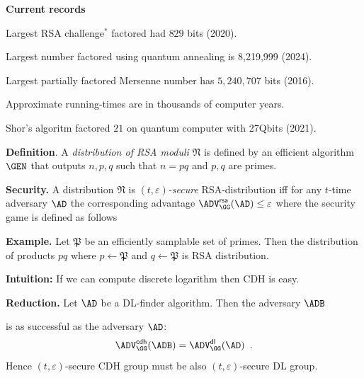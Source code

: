 \documentclass[landscape,footrule]{foils}
\newcommand{\lastline}{\vspace*{-2ex}}
\begin{document}
\textbf{Current records}
\begin{triangles}
  \item Largest RSA challenge$^*$ factored had $829$ bits (2020).
  \item Largest number factored using quantum annealing is 8,219,999 (2024). 
  \item Largest partially factored Mersenne number has $5,240,707$ bits (2016).
  \item Approximate running-times are in thousands of computer years.
  \item Shor's algoritm factored $21$ on quantum computer with 27Qbits (2021).
\end{triangles}\vspace*{-5ex}


\textbf{Definition}. A \emph{distribution of RSA moduli} $\mathfrak{N}$ is
defined by an efficient algorithm $\GEN$ that outputs $n,p,q$ such
that $n=pq$ and $p,q$ are primes.
\bigskip

\textbf{Security.} A distribution $\mathfrak{N}$ is
\emph{$(t,\varepsilon)$-secure} RSA-distribution iff for any $t$-time
adversary $\AD$ the corresponding advantage
$\advRSAXX{\GG}{\AD}\leq\varepsilon$ where the security game is
defined as follows
 

\textbf{Example.}  Let $\mathfrak{P}$ be an efficiently samplable set
of primes. Then the distribution of products $pq$ where
$p\gets\mathfrak{P}$ and $q\gets\mathfrak{P}$ is RSA distribution. 
\lastline





\textbf{Intuition:} If we can compute discrete logarithm then CDH is easy.


\textbf{Reduction.} Let $\AD$ be a DL-finder algorithm. Then the adversary $\ADB$


is as successful as the adversary $\AD$:
\begin{align*}
  \advCDHXX{\GG}{\ADB}=\advDLXX{\GG}{\AD}\enspace.
\end{align*}
Hence $(t,\varepsilon)$-secure CDH group must be also $(t,\varepsilon)$-secure DL group.
\lastline
\end{document}
